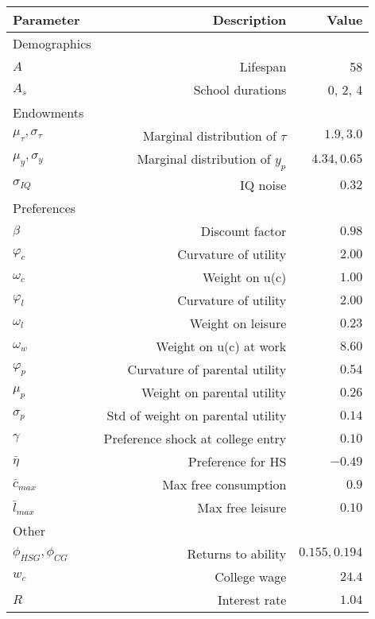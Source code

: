 \begin{tabular}{lrr}
\hline
Parameter & Description  & Value  \\ 
\hline
Demographics &   &   \\ 
$A$ & Lifespan  & 58  \\ 
$A_{s}$ & School durations  & 0, 2, 4  \\ 
Endowments &   &   \\ 
$\mu_{\tau}, \sigma_{\tau}$ & Marginal distribution of $\tau$  & $1.9, 3.0$  \\ 
$\mu_{y}, \sigma_{y}$ & Marginal distribution of $y_{p}$  & $4.34, 0.65$  \\ 
$\sigma_{IQ}$ & IQ noise  & $0.32$  \\ 
Preferences &   &   \\ 
$\beta$ & Discount factor  & $0.98$  \\ 
$\varphi_{c}$ & Curvature of utility  & $2.00$  \\ 
$\omega_{c}$ & Weight on u(c)  & $1.00$  \\ 
$\varphi_{l}$ & Curvature of utility  & $2.00$  \\ 
$\omega_{l}$ & Weight on leisure  & $0.23$  \\ 
$\omega_{w}$ & Weight on u(c) at work  & $8.60$  \\ 
$\varphi_{p}$ & Curvature of parental utility  & $0.54$  \\ 
$\mu_{p}$ & Weight on parental utility  & $0.26$  \\ 
$\sigma_{p}$ & Std of weight on parental utility  & $0.14$  \\ 
$\gamma$ & Preference shock at college entry  & $0.10$  \\ 
$\bar{\eta}$ & Preference for HS  & $-0.49$  \\ 
$\bar{c}_{max}$ & Max free consumption  & $0.9$  \\ 
$\bar{l}_{max}$ & Max free leisure  & $0.10$  \\ 
Other &   &   \\ 
$\phi_{HSG}, \phi_{CG}$ & Returns to ability  & $0.155, 0.194$  \\ 
$w_{c}$ & College wage  & $24.4$  \\ 
$R$ & Interest rate  & $1.04$  \\ 
\hline
\end{tabular}%
